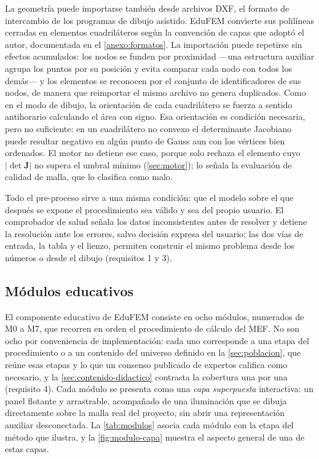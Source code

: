 La geometría puede importarse también desde archivos DXF, el formato de intercambio de los programas de dibujo asistido. EduFEM convierte sus polilíneas cerradas en elementos cuadriláteros según la convención de capas que adoptó el autor, documentada en el \autoref{anexo:formatos}. La importación puede repetirse sin efectos acumulados: los nodos se funden por proximidad —una estructura auxiliar agrupa los puntos por su posición y evita comparar cada nodo con todos los demás— y los elementos se reconocen por el conjunto de identificadores de sus nodos, de manera que reimportar el mismo archivo no genera duplicados. Como en el modo de dibujo, la orientación de cada cuadrilátero se fuerza a sentido antihorario calculando el área con signo. Esa orientación es condición necesaria, pero no suficiente: en un cuadrilátero no convexo el determinante Jacobiano puede resultar negativo en algún punto de Gauss aun con los vértices bien ordenados. El motor no detiene ese caso, porque solo rechaza el elemento cuyo $\lvert\det\bm{J}\rvert$ no supera el umbral mínimo (\autoref{sec:motor}); lo señala la evaluación de calidad de malla, que lo clasifica como malo.

Todo el pre-proceso sirve a una misma condición: que el modelo sobre el que después se expone el procedimiento sea válido y sea del propio usuario. El comprobador de salud señala los datos inconsistentes antes de resolver y detiene la resolución ante los errores, salvo decisión expresa del usuario; las dos vías de entrada, la tabla y el lienzo, permiten construir el mismo problema desde los números o desde el dibujo (requisitos 1 y 3).

\subsection{Módulos educativos}
\label{sec:educacion}

El componente educativo de EduFEM consiste en ocho módulos, numerados de M0 a M7, que recorren en orden el procedimiento de cálculo del MEF. No son ocho por conveniencia de implementación: cada uno corresponde a una etapa del procedimiento o a un contenido del universo definido en la \autoref{sec:poblacion}, que reúne esas etapas y lo que un consenso publicado de expertos califica como necesario, y la \autoref{sec:contenido-didactico} contrasta la cobertura una por una (requisito 4). Cada módulo se presenta como una \emph{capa superpuesta} interactiva: un panel flotante y arrastrable, acompañado de una iluminación que se dibuja directamente sobre la malla real del proyecto, sin abrir una representación auxiliar desconectada. La \autoref{tab:modulos} asocia cada módulo con la etapa del método que ilustra, y la \autoref{fig:modulo-capa} muestra el aspecto general de una de estas capas.

